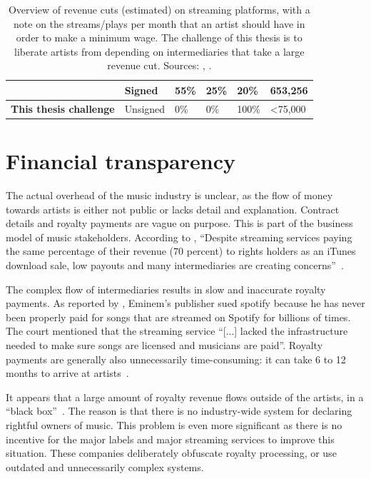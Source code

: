 \begin{table}[]
\begin{tabular}{|l|l|l|l|l|l|}
                               & Signed                      & 55\%               & 25\%                  & 20\%                     & 653,256                                                                                                    \\ \hline
\textbf{This thesis challenge} & Unsigned                    & 0\%                & 0\%                   & 100\%                    & \textless 75,000                                                                                           \\ \hline
\end{tabular}
\caption{Overview of revenue cuts (estimated) on streaming platforms, with a note on the streams/plays per month that an artist should have in order to make a minimum wage. The challenge of this thesis is to liberate artists from depending on intermediaries that take a large revenue cut. Sources: \cite{thetrichordist2014}, \cite{digitalmusicnews2018}.}
\label{tab:revenue-cuts}
\end{table}

\section{Financial transparency}
\label{sec:problem-financial-transparency}
The actual overhead of the music industry is unclear, as the flow of money towards artists is either not public or lacks detail and explanation. Contract details and royalty payments are vague on purpose. This is part of the business model of music stakeholders. According to \cite{music2015fair}, ``Despite streaming services paying the same percentage of their revenue (70 percent) to rights holders as an iTunes download sale, low payouts and many intermediaries are creating concerns''~\citep{music2015fair}.

The complex flow of intermediaries results in slow and inaccurate royalty payments. As reported by \cite{bbc2019}, Eminem's publisher sued spotify because he has never been properly paid for songs that are streamed on Spotify for billions of times. The court mentioned that the streaming service ``[...] lacked the infrastructure needed to make sure songs are licensed and musicians are paid''. Royalty payments are generally also unnecessarily time-consuming: it can take 6 to 12 months to arrive at artists~\citep{music2015fair}. 

It appears that a large amount of royalty revenue flows outside of the artists, in a ``black box''~\citep{music2015fair}. The reason is that there is no industry-wide system for declaring rightful owners of music. This problem is even more significant as there is no incentive for the major labels and major streaming services to improve this situation. These companies deliberately obfuscate royalty processing, or use outdated and unnecessarily complex systems.

